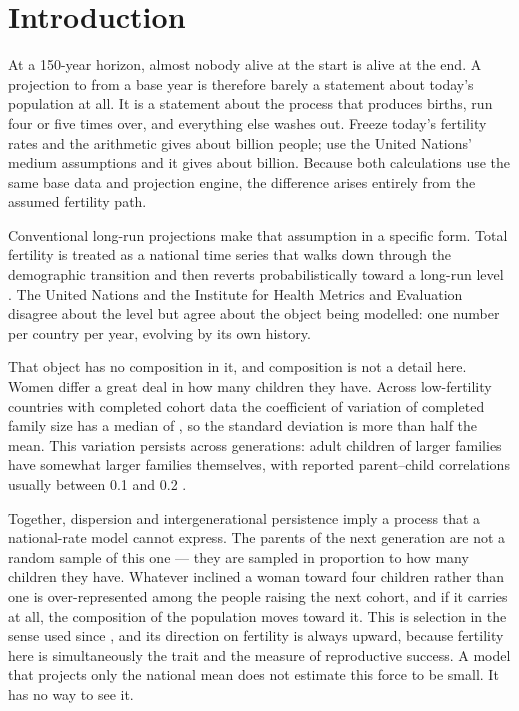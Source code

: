 \section{Introduction}
\label{sec:introduction}

At a 150-year horizon, almost nobody alive at the start is alive at the end. A
projection to \ProjectionEndYear{} from a \PhaseFiveBaseYear{} base year is
therefore barely a statement about today's population at all. It is a statement
about the process that produces births, run four or five times over, and
everything else washes out. Freeze today's fertility rates and the arithmetic
gives about \ConstantFertilityTwentyOneFifty{} billion people; use the United
Nations' medium assumptions and it gives about
\UnEquivalentTwentyOneFifty{} billion. Because both calculations use the same
base data and projection engine, the difference arises entirely from the assumed
fertility path.

Conventional long-run projections make that assumption in a specific form.
Total fertility is treated as a national time series that walks down through the
demographic transition and then reverts probabilistically toward a long-run
level \citep{alkema2011,raftery2012,sevcikova2016}. The United Nations
\citep{un2024methodology} and the Institute for Health Metrics and Evaluation
\citep{vollset2020} disagree about the level but agree about the object being
modelled: one number per country per year, evolving by its own history.

That object has no composition in it, and composition is not a detail here.
Women differ a great deal in how many children they have. Across
\CVCountries{} low-fertility countries with completed cohort data the
coefficient of variation of completed family size has a median of \CVMedian{},
so the standard deviation is more than half the mean. This variation persists
across generations: adult children of larger families have somewhat larger
families themselves, with
reported parent--child correlations usually between 0.1 and 0.2
\citep{murphy1999,murphy2013}.

Together, dispersion and intergenerational persistence imply a process that a
national-rate model cannot express. The parents of the next generation are not a
random sample of this one
--- they are sampled in proportion to how many children they have. Whatever
inclined a woman toward four children rather than one is over-represented among
the people raising the next cohort, and if it carries at all, the composition of
the population moves toward it. This is selection in the sense used since
\citet{fisher1930}, and its direction on fertility is always upward, because
fertility here is simultaneously the trait and the measure of reproductive
success. A model that projects only the national mean does not estimate this
force to be small. It has no way to see it.

